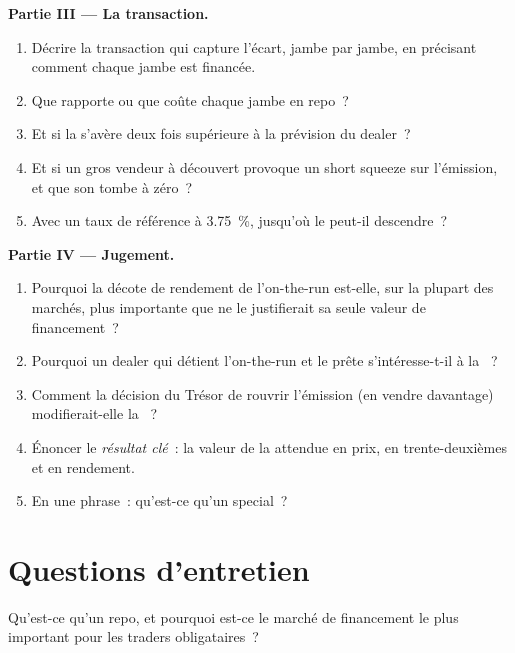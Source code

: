 \begin{problem}
\medskip\noindent\textbf{Partie III --- La transaction.}
\begin{enumerate}[resume]
\item Décrire la transaction qui capture l'écart, jambe par jambe, en précisant
comment chaque jambe est financée.
\item Que rapporte ou que coûte chaque jambe en repo~?
\item Et si la  s'avère deux fois supérieure à la prévision du dealer~?
\item Et si un gros vendeur à découvert provoque un short squeeze sur l'émission, et que son  tombe à zéro~?
\item Avec un taux de référence à 3.75~\%, jusqu'où le  peut-il descendre~?
\end{enumerate}

\medskip\noindent\textbf{Partie IV --- Jugement.}
\begin{enumerate}[resume]
\item Pourquoi la décote de rendement de l'on-the-run est-elle, sur la plupart des marchés, plus
importante que ne le justifierait sa seule valeur de financement~?
\item Pourquoi un dealer qui détient l'on-the-run et le prête s'intéresse-t-il
à la ~?
\item Comment la décision du Trésor de rouvrir l'émission (en vendre davantage)
modifierait-elle la ~?
\item Énoncer le \emph{résultat clé}~: la valeur de la  attendue en prix, en
trente-deuxièmes et en rendement.
\item En une phrase~: qu'est-ce qu'un special~?
\end{enumerate}
\end{problem}

\section{Questions d'entretien}

\begin{interviewq}\label{iq:m2:repo-and-specials:1}
Qu'est-ce qu'un repo, et pourquoi est-ce le marché de financement le plus important pour les
traders obligataires~?
\end{interviewq}

